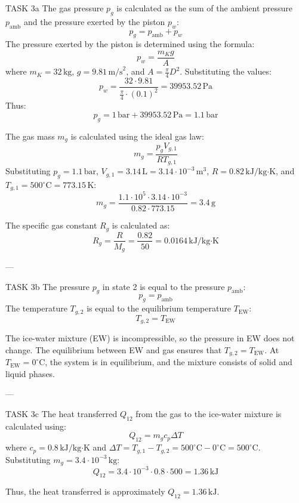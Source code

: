 TASK 3a  
The gas pressure \( p_g \) is calculated as the sum of the ambient pressure \( p_{\text{amb}} \) and the pressure exerted by the piston \( p_w \):  
\[
p_g = p_{\text{amb}} + p_w
\]  
The pressure exerted by the piston is determined using the formula:  
\[
p_w = \frac{m_K g}{A}
\]  
where \( m_K = 32 \, \text{kg} \), \( g = 9.81 \, \text{m/s}^2 \), and \( A = \frac{\pi}{4} D^2 \). Substituting the values:  
\[
p_w = \frac{32 \cdot 9.81}{\frac{\pi}{4} \cdot (0.1)^2} = 39953.52 \, \text{Pa}
\]  
Thus:  
\[
p_g = 1 \, \text{bar} + 39953.52 \, \text{Pa} = 1.1 \, \text{bar}
\]  

The gas mass \( m_g \) is calculated using the ideal gas law:  
\[
m_g = \frac{p_g V_{g,1}}{R T_{g,1}}
\]  
Substituting \( p_g = 1.1 \, \text{bar} \), \( V_{g,1} = 3.14 \, \text{L} = 3.14 \cdot 10^{-3} \, \text{m}^3 \), \( R = 0.82 \, \text{kJ/kg·K} \), and \( T_{g,1} = 500^\circ\text{C} = 773.15 \, \text{K} \):  
\[
m_g = \frac{1.1 \cdot 10^5 \cdot 3.14 \cdot 10^{-3}}{0.82 \cdot 773.15} = 3.4 \, \text{g}
\]  

The specific gas constant \( R_g \) is calculated as:  
\[
R_g = \frac{R}{M_g} = \frac{0.82}{50} = 0.0164 \, \text{kJ/kg·K}
\]  

---

TASK 3b  
The pressure \( p_g \) in state 2 is equal to the pressure \( p_{\text{amb}} \):  
\[
p_g = p_{\text{amb}}
\]  
The temperature \( T_{g,2} \) is equal to the equilibrium temperature \( T_{\text{EW}} \):  
\[
T_{g,2} = T_{\text{EW}}
\]  

The ice-water mixture (EW) is incompressible, so the pressure in EW does not change. The equilibrium between EW and gas ensures that \( T_{g,2} = T_{\text{EW}} \). At \( T_{\text{EW}} = 0^\circ\text{C} \), the system is in equilibrium, and the mixture consists of solid and liquid phases.  

---

TASK 3c  
The heat transferred \( Q_{12} \) from the gas to the ice-water mixture is calculated using:  
\[
Q_{12} = m_g c_p \Delta T
\]  
where \( c_p = 0.8 \, \text{kJ/kg·K} \) and \( \Delta T = T_{g,1} - T_{g,2} = 500^\circ\text{C} - 0^\circ\text{C} = 500^\circ\text{C} \). Substituting \( m_g = 3.4 \cdot 10^{-3} \, \text{kg} \):  
\[
Q_{12} = 3.4 \cdot 10^{-3} \cdot 0.8 \cdot 500 = 1.36 \, \text{kJ}
\]  

Thus, the heat transferred is approximately \( Q_{12} = 1.36 \, \text{kJ} \).